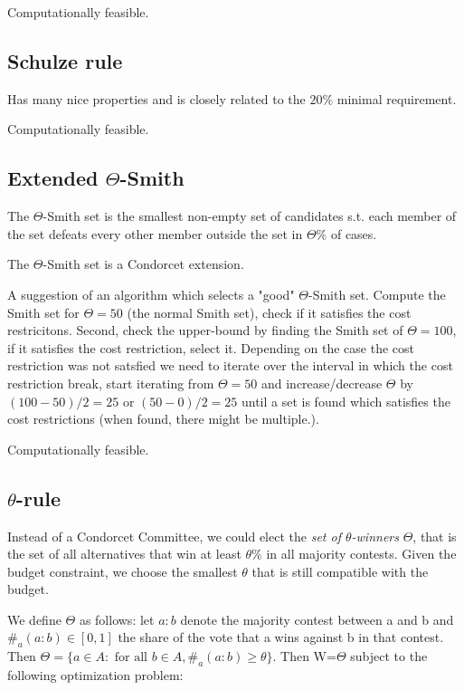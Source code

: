 \documentclass{article}
\begin{document}
Computationally feasible.\subsection{Schulze rule}

Has many nice properties and is closely related to the $20\%$ minimal requirement.

Computationally feasible.


\subsection{Extended $\Theta$-Smith}

The $\Theta$-Smith set is the smallest non-empty set of candidates s.t. each member of the set defeats every other member outside
 the set in $\Theta \%$ of cases.

 The $\Theta$-Smith set is a Condorcet extension.

A suggestion of an algorithm which selects a "good" $\Theta$-Smith set. Compute the Smith set for $\Theta=50$
(the normal Smith set), check if it satisfies the cost restricitons. Second, check the upper-bound by finding the Smith
set of $\Theta=100$, if it satisfies the cost restriction, select it. Depending on the case the cost restriction was not
satsfied we need to iterate over the interval in which the cost restriction break, start iterating from $\Theta=50$ and
 increase/decrease $\Theta$ by $(100-50)/2=25$ or $(50-0)/2=25$ until a set is found which satisfies the cost
 restrictions (when found, there might be multiple.).

Computationally feasible.

\subsection{$\theta$-rule}

Instead of a Condorcet Committee, we could elect the \emph {set of $\theta$-winners} $\Theta$, that is the set
of all alternatives that win at least $\theta \% $ in all majority contests. Given the budget constraint, we
choose the smallest $\theta$ that is still compatible with the budget.

We define $\Theta$ as follows: let $a:b$ denote the majority contest between a and b and $\#_a(a:b)\in [0,1]$ the
share of the vote that a wins against b in that contest. Then $\Theta=\{a\in A: \text { for all } b\in A, \#_a(a:b)\geq \theta\}$. Then W=$\Theta$ subject to the following optimization problem:
\end{document}

